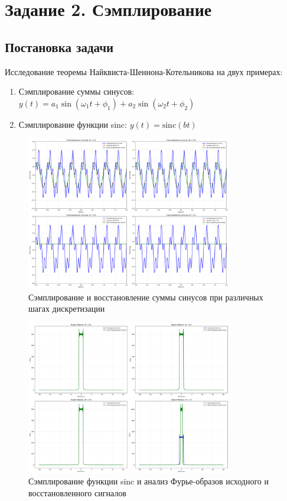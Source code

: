 \section*{Задание 2. Сэмплирование}

\subsection*{Постановка задачи}

Исследование теоремы Найквиста-Шеннона-Котельникова на двух примерах:
\begin{enumerate}
    \item Сэмплирование суммы синусов: $y(t) = a_1\sin(\omega_1 t + \phi_1) + a_2\sin(\omega_2 t + \phi_2)$
    \item Сэмплирование функции sinc: $y(t) = \text{sinc}(bt)$
\end{enumerate}

\begin{figure}[H]
    \centering
    \includegraphics[width=0.8\textwidth]{images/task2/sampling_sines.png}
    \caption{Сэмплирование и восстановление суммы синусов при различных шагах дискретизации}
    \label{fig:sampling_sines}
\end{figure}

\begin{figure}[H]
    \centering
    \includegraphics[width=0.8\textwidth]{images/task2/sampling_sinc_fourier.png}
    \caption{Сэмплирование функции sinc и анализ Фурье-образов исходного и восстановленного сигналов}
    \label{fig:sampling_sinc_fourier}
\end{figure}

